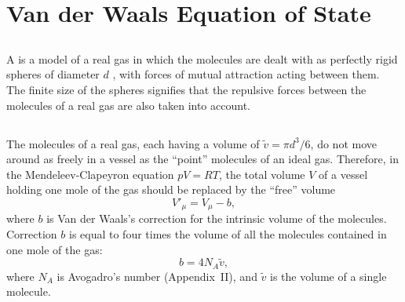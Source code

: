 \section{Van der Waals Equation of State}
\label{sec-12.2}

\subsection{}\label{12.2.1} A  is a model of a real gas in which the molecules are dealt with as perfectly rigid spheres of diam­eter $d$ , with forces of mutual attraction acting between them. The finite size of the spheres signifies that the repulsive forces between the molecules of a real gas are also taken into account.

\subsection{}\label{12.2.2} The molecules of a real gas, each having a volume of $\tilde{v} = \pi d^{3}/6$, do not move around as freely in a vessel as the ``point'' molecules of an ideal gas. Therefore, in the Mendeleev-Clapeyron equation  $pV = RT$, the total volume $V$ of a vessel holding one mole of the gas should be replaced by the ``free'' volume
\begin{equation*}%
V'_{\mu} = V_{\mu} - b,
\end{equation*}
where $b$ is Van der Waals's correction for the intrinsic volume of the molecules. Correction $b$ is equal to four times the volume of all the molecules contained in one mole of the gas:
\begin{equation*}%
b = 4N_{A} \tilde{v},
\end{equation*}
where $N_{A}$ is Avogadro's number (Appendix~II), and $\tilde{v}$ is the volume of a single molecule.

